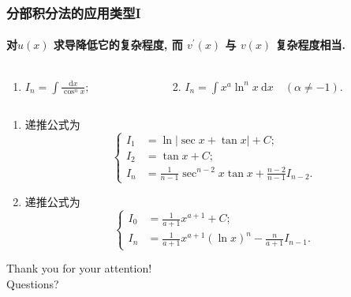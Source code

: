 \documentclass[
10pt,
aspectratio=43,
]{beamer}
\begin{document}
\begin{frame}
	\frametitle{分部积分法的应用类型I}
	\framesubtitle{对$u(x)$ 求导降低它的复杂程度, 而 $v^{\prime}(x)$ 与 $v(x)$ 复杂程度相当. }
	\everymath{\displaystyle}
	\begin{block}{}
		\begin{columns}[onlytextwidth]
			\begin{column}{0.5\textwidth}
				\begin{enumerate}
					\item $I_n=\int \frac{\mathrm{d} x}{\cos ^n x}$;
				\end{enumerate}
			\end{column}
			\begin{column}{0.5\textwidth}
				\begin{enumerate}
					\setcounter{enumi}{1}
					\item $I_n=\int x^a \ln ^n x \mathrm{~d} x \quad(\alpha \neq-1)$.
				\end{enumerate}
			\end{column}
		\end{columns}
	\end{block}
	\begin{exampleblock}{}
		\begin{enumerate}
			\pause \item 递推公式为
			      $$
				      \left\{
				      \begin{aligned}
					      I_1 & =\ln\left|\sec x+\tan x\right|+C;                       \\
					      I_2 & =\tan x+C;                                              \\
					      I_n & =\frac{1}{n-1}\sec^{n-2}x\tan x+\frac{n-2}{n-1}I_{n-2}.
				      \end{aligned}
				      \right.
			      $$
				  \pause \item 递推公式为
			      $$
				      \left\{
				      \begin{aligned}
					      I_0 & =\frac{1}{a+1}x^{a+1}+C;                                        \\
					      I_n & =\frac{1}{a+1}x^{a+1}\left(\ln x\right)^n-\frac{n}{a+1}I_{n-1}.
				      \end{aligned}
				      \right.
			      $$
		\end{enumerate}
	\end{exampleblock}
\end{frame}

\begin{frame}[plain]
	\vfill
	\centering
	{
		\centering \Huge \color{white} Thank you for your attention!\\[10pt]Questions?
	}
	\vfill
\end{frame}
\end{document}
